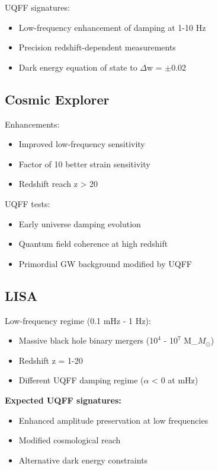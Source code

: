 \documentclass[12pt,a4paper]{article}
\begin{document}
UQFF signatures:

\begin{itemize}
  \item Low-frequency enhancement of damping at 1-10 Hz
  \item Precision redshift-dependent measurements
  \item Dark energy equation of state to $\Delta$w = $\pm$0.02
\end{itemize}

\subsection{Cosmic Explorer}

Enhancements:

\begin{itemize}
  \item Improved low-frequency sensitivity
  \item Factor of 10 better strain sensitivity
  \item Redshift reach z > 20
\end{itemize}

UQFF tests:

\begin{itemize}
  \item Early universe damping evolution
  \item Quantum field coherence at high redshift
  \item Primordial GW background modified by UQFF
\end{itemize}

\subsection{LISA}

Low-frequency regime (0.1 mHz - 1 Hz):

\begin{itemize}
  \item Massive black hole binary mergers (1$0^{4}$ - 1$0^{7}$ M\_{$M_{\odot}$})
  \item Redshift z = 1-20
  \item Different UQFF damping regime ($\alpha$ < 0 at mHz)
\end{itemize}

\textbf{Expected UQFF signatures:}

\begin{itemize}
  \item Enhanced amplitude preservation at low frequencies
  \item Modified cosmological reach
  \item Alternative dark energy constraints
\end{itemize}
\end{document}

